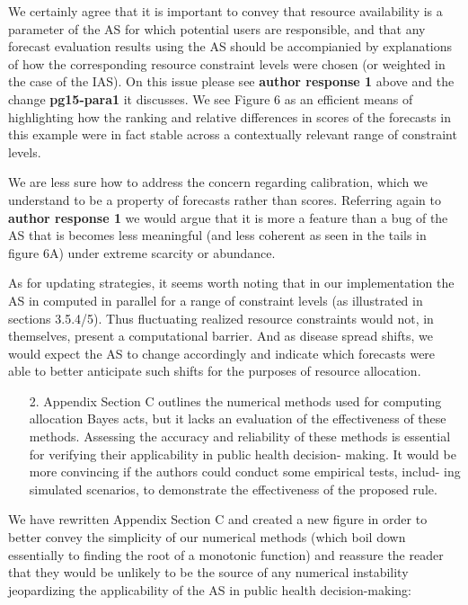 \documentclass{article}
\begin{document}
We certainly agree that it is important to convey that resource availability is a parameter of the AS for which potential users are responsible, and
that any forecast evaluation results using the AS should be accompianied by explanations of how the corresponding resource constraint levels were chosen 
(or weighted in the case of the IAS).  On this issue please see \textbf{author response 1} above and the change \textbf{pg15-para1} it discusses.  We see 
Figure 6 as an efficient means of highlighting how the ranking and relative differences in scores of the forecasts in this example were in fact stable across a
contextually relevant range of constraint levels.

We are less sure how to address the concern regarding calibration, which we understand to be a property of forecasts rather than scores. Referring again to
\textbf{author response 1} we would argue that it is more a feature than a bug of the AS that is becomes less meaningful 
(and less coherent as seen in the tails in figure 6A) under extreme scarcity or abundance.

As for updating strategies, it seems worth noting that in our implementation the AS in computed in parallel for a range of constraint levels 
(as illustrated in sections 3.5.4/5). Thus fluctuating realized resource constraints would not, in themselves, present a computational barrier. And as
disease spread shifts, we would expect the AS to change accordingly and indicate which forecasts were able to better anticipate such shifts for the
purposes of resource allocation.

\begin{quotebar}
\begin{enumerate}
  \item[2.] Appendix Section C outlines the numerical methods used for computing allocation Bayes acts, but it lacks an evaluation of the effectiveness of these methods. Assessing the accuracy and reliability of these methods is essential for verifying their applicability in public health decision- making. It would be more convincing if the authors could conduct some empirical tests, includ- ing simulated scenarios, to demonstrate the effectiveness of the proposed rule.
\end{enumerate}
\end{quotebar}

We have rewritten Appendix Section C and created a new figure in order to better convey the simplicity of our numerical methods 
(which boil down essentially to finding the root of a monotonic function)
and reassure the reader that they would be unlikely to be the source of any numerical instability jeopardizing the applicability of the AS in
public health decision-making:
\end{document}
